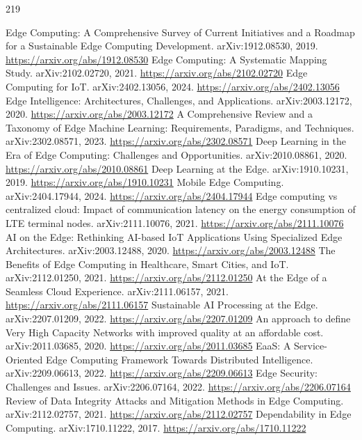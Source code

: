 \documentclass[11pt]{article}
\begin{document}
\begin{thebibliography}{219}
 Edge Computing: A Comprehensive Survey of Current Initiatives and a Roadmap for a Sustainable Edge Computing Development. arXiv:1912.08530, 2019. \url{https://arxiv.org/abs/1912.08530}
 Edge Computing: A Systematic Mapping Study. arXiv:2102.02720, 2021. \url{https://arxiv.org/abs/2102.02720}
 Edge Computing for IoT. arXiv:2402.13056, 2024. \url{https://arxiv.org/abs/2402.13056}
 Edge Intelligence: Architectures, Challenges, and Applications. arXiv:2003.12172, 2020. \url{https://arxiv.org/abs/2003.12172}
 A Comprehensive Review and a Taxonomy of Edge Machine Learning: Requirements, Paradigms, and Techniques. arXiv:2302.08571, 2023. \url{https://arxiv.org/abs/2302.08571}
 Deep Learning in the Era of Edge Computing: Challenges and Opportunities. arXiv:2010.08861, 2020. \url{https://arxiv.org/abs/2010.08861}
 Deep Learning at the Edge. arXiv:1910.10231, 2019. \url{https://arxiv.org/abs/1910.10231}
 Mobile Edge Computing. arXiv:2404.17944, 2024. \url{https://arxiv.org/abs/2404.17944}
 Edge computing vs centralized cloud: Impact of communication latency on the energy consumption of LTE terminal nodes. arXiv:2111.10076, 2021. \url{https://arxiv.org/abs/2111.10076}
 AI on the Edge: Rethinking AI-based IoT Applications Using Specialized Edge Architectures. arXiv:2003.12488, 2020. \url{https://arxiv.org/abs/2003.12488}
 The Benefits of Edge Computing in Healthcare, Smart Cities, and IoT. arXiv:2112.01250, 2021. \url{https://arxiv.org/abs/2112.01250}
 At the Edge of a Seamless Cloud Experience. arXiv:2111.06157, 2021. \url{https://arxiv.org/abs/2111.06157}
 Sustainable AI Processing at the Edge. arXiv:2207.01209, 2022. \url{https://arxiv.org/abs/2207.01209}
 An approach to define Very High Capacity Networks with improved quality at an affordable cost. arXiv:2011.03685, 2020. \url{https://arxiv.org/abs/2011.03685}
 EaaS: A Service-Oriented Edge Computing Framework Towards Distributed Intelligence. arXiv:2209.06613, 2022. \url{https://arxiv.org/abs/2209.06613}
 Edge Security: Challenges and Issues. arXiv:2206.07164, 2022. \url{https://arxiv.org/abs/2206.07164}
 Review of Data Integrity Attacks and Mitigation Methods in Edge Computing. arXiv:2112.02757, 2021. \url{https://arxiv.org/abs/2112.02757}
 Dependability in Edge Computing. arXiv:1710.11222, 2017. \url{https://arxiv.org/abs/1710.11222}

\end{thebibliography}
\end{document}
